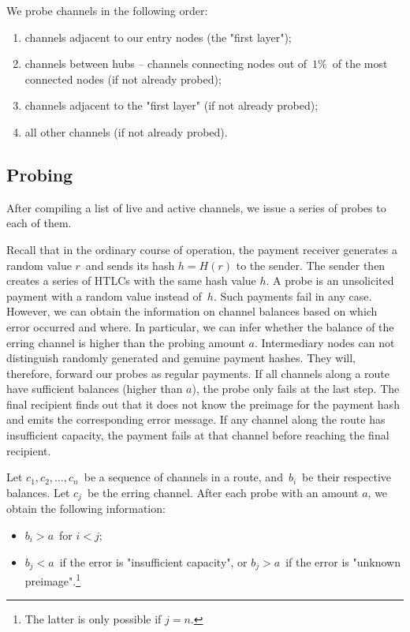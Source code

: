 We probe channels in the following order:

\begin{enumerate}
	\item channels adjacent to our entry nodes (the "first layer");
	\item channels between hubs -- channels connecting nodes out of~$1\%$~of the most connected nodes (if not already probed);
	\item channels adjacent to the "first layer" (if not already probed);
	\item all other channels (if not already probed).
\end{enumerate}

\subsection{Probing}

After compiling a list of live and active channels, we issue a series of probes to each of them.

Recall that in the ordinary course of operation, the payment receiver generates a random value $r$~and sends its hash $h = H(r)$ to the sender.
The sender then creates a series of HTLCs with the same hash value $h$.
A probe is an unsolicited payment with a random value instead of~$h$.
Such payments fail in any case.
However, we can obtain the information on channel balances based on which error occurred and where.
In particular, we can infer whether the balance of the erring channel is higher than the probing amount $a$.
Intermediary nodes can not distinguish randomly generated and genuine payment hashes.
They will, therefore, forward our probes as regular payments.
If all channels along a route have sufficient balances (higher than $a$), the probe only fails at the last step.
The final recipient finds out that it does not know the preimage for the payment hash and emits the corresponding error message.
If any channel along the route has insufficient capacity, the payment fails at that channel before reaching the final recipient.

Let $c_1, c_2, \dots, c_n$~be a sequence of channels in a route, and~$b_i$~be their respective balances.
Let $c_j$~be the erring channel.
After each probe with an amount $a$, we obtain the following information:
\begin{itemize}
	\item $b_i > a$~for $i<j$;
	\item $b_j < a$~if the error is "insufficient capacity", or $b_j > a$~if the error is "unknown preimage".\footnote{The latter is only possible if $j=n$.}
\end{itemize}

